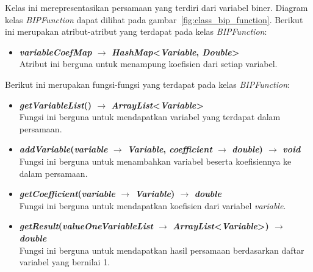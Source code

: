 Kelas ini merepresentasikan persamaan yang terdiri dari variabel biner. Diagram kelas \textit{BIPFunction} dapat dilihat pada gambar~\ref{fig:class_bip_function}. Berikut ini merupakan atribut-atribut yang terdapat pada kelas \textit{BIPFunction}:
\begin{itemize}
	\item \textbf{\textit{variableCoefMap} $\rightarrow$ \textit{HashMap}<\textit{Variable}, \textit{Double}>}\\
	Atribut ini berguna untuk menampung koefisien dari setiap variabel.
\end{itemize}
Berikut ini merupakan fungsi-fungsi yang terdapat pada kelas \textit{BIPFunction}:
\begin{itemize}
	\item \textbf{\textit{getVariableList}() $\rightarrow$ \textit{ArrayList}<\textit{Variable}>}\\
	Fungsi ini berguna untuk mendapatkan variabel yang terdapat dalam persamaan.
	\item \textbf{\textit{addVariable}(\textit{variable} $\rightarrow$ \textit{Variable}, \textit{coefficient} $\rightarrow$ \textit{double}) $\rightarrow$ \textit{void}}\\
	Fungsi ini berguna untuk menambahkan variabel beserta koefisiennya ke dalam persamaan.
	\item \textbf{\textit{getCoefficient}(\textit{variable} $\rightarrow$ \textit{Variable}) $\rightarrow$ \textit{double}}\\
	Fungsi ini berguna untuk mendapatkan koefisien dari variabel \textit{variable}.
	\item \textbf{\textit{getResult}(\textit{valueOneVariableList} $\rightarrow$ \textit{ArrayList}<\textit{Variable}>) $\rightarrow$ \textit{double}}\\
	Fungsi ini berguna untuk mendapatkan hasil persamaan berdasarkan daftar variabel yang bernilai 1.
\end{itemize}

